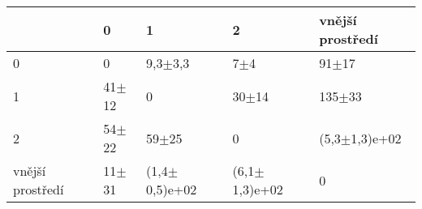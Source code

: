 \begin{tabular}{lllll}
\toprule
{} &        0 &                1 &                2 & vnější prostředí \\
\midrule
0                &        0 &        9,3$\pm$3,3 &            7$\pm$4 &          91$\pm$17 \\
1                &  41$\pm$12 &                0 &          30$\pm$14 &         135$\pm$33 \\
2                &  54$\pm$22 &          59$\pm$25 &                0 &  (5,3$\pm$1,3)e+02 \\
vnější prostředí &  11$\pm$31 &  (1,4$\pm$0,5)e+02 &  (6,1$\pm$1,3)e+02 &                0 \\
\bottomrule
\end{tabular}

